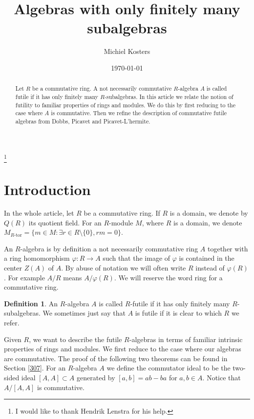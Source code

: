 \documentclass{amsart}
\theoremstyle{plain}
\theoremstyle{definition}
\newtheorem{definition}[theorem]{Definition}
\begin{document}
\title[Futile algebras]{Algebras with only finitely many subalgebras}
\author{Michiel Kosters}
\address{Mathematisch Instituut
P.O. Box 9512
2300 RA Leiden
The Netherlands}
\date{\today}
\keywords{}
\subjclass[2010]{}
\thanks{I would like to thank Hendrik Lenstra for his help.}

\begin{abstract}
Let $R$ be a commutative ring. A not necessarily commutative $R$-algebra $A$ is called futile if it has only finitely many
$R$-subalgebras. In this article we relate the notion of futility to familiar properties of
rings and modules. We do this by first reducing to the case where $A$ is commutative. Then we refine the description of
commutative futile algebras from Dobbs, Picavet and Picavet-L'hermite.
\end{abstract}

\maketitle
\tableofcontents

\section{Introduction}

In the whole article, let $R$ be a commutative ring. If $R$ is a domain, we denote by $Q(R)$ its quotient field. For an $R$-module $M$, where $R$ is a domain, we denote $M_{R\textrm{-tor}}=\{m \in M: \exists r \in R \setminus \{0\}, rm=0\}$. 

An $R$-algebra is by definition a not necessarily commutative
ring $A$ together with a ring homomorphism $\varphi: R \to A$ such that the image of $\varphi$ is contained in the center $Z(A)$ of $A$.  By abuse of
notation we will often write $R$ instead of $\varphi(R)$. For example $A/R$ means $A/\varphi(R)$. 
We will reserve the word ring for a commutative ring.

\begin{definition}
 An $R$-algebra $A$ is called $R$-futile if it has only finitely many $R$-subalgebras. We sometimes just say that $A$ is futile if it is clear to
which $R$ we refer.
\end{definition}

Given $R$, we want to describe the futile $R$-algebras in terms of familiar intrinsic properties of rings and modules.
We first
reduce to the case where our algebras are commutative. The proof of the following two theorems can be found in
Section \ref{307}. For an $R$-algebra
$A$ we define the commutator ideal to be the two-sided ideal $[A,A] \subset A$ generated by $[a,b]=ab-ba$ for $a,b \in A$. Notice that $A/[A,A]$ is
commutative. 
\end{document}
